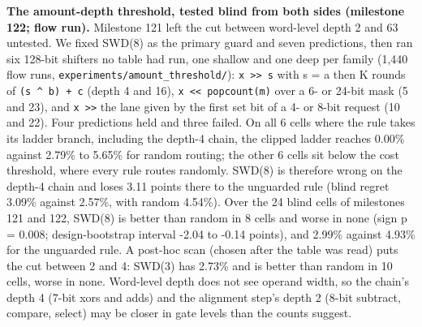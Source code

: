 \documentclass[conference]{IEEEtran}
\begin{document}
\textbf{The amount-depth threshold, tested blind from both sides
(milestone 122; flow run).} Milestone 121 left the cut between
word-level depth 2 and 63 untested. We fixed SWD(8) as the primary guard
and seven predictions, then ran six 128-bit shifters no table had run,
one shallow and one deep per family (1,440 flow runs,
\texttt{experiments/\allowbreak{}amount\_\allowbreak{}threshold/\allowbreak{}}):
\texttt{x\ \textgreater{}\textgreater{}\ s} with s = a then K rounds of
\texttt{(s\ \^{}\ b)\ +\ c} (depth 4 and 16),
\texttt{x\ \textless{}\textless{}\ popcount(m)} over a 6- or 24-bit mask
(5 and 23), and \texttt{x\ \textgreater{}\textgreater{}} the lane given
by the first set bit of a 4- or 8-bit request (10 and 22). Four
predictions held and three failed. On all 6 cells where the rule takes
its ladder branch, including the depth-4 chain, the clipped ladder
reaches 0.00\% against 2.79\% to 5.65\% for random routing; the other 6
cells sit below the cost threshold, where every rule routes randomly.
SWD(8) is therefore wrong on the depth-4 chain and loses 3.11 points
there to the unguarded rule (blind regret 3.09\% against 2.57\%, with
random 4.54\%). Over the 24 blind cells of milestones 121 and 122,
SWD(8) is better than random in 8 cells and worse in none (sign p =
0.008; design-bootstrap interval -2.04 to -0.14 points), and 2.99\%
against 4.93\% for the unguarded rule. A post-hoc scan (chosen after the
table was read) puts the cut between 2 and 4: SWD(3) has 2.73\% and is
better than random in 10 cells, worse in none. Word-level depth does not
see operand width, so the chain's depth 4 (7-bit xors and adds) and the
alignment step's depth 2 (8-bit subtract, compare, select) may be closer
in gate levels than the counts suggest.
\end{document}
